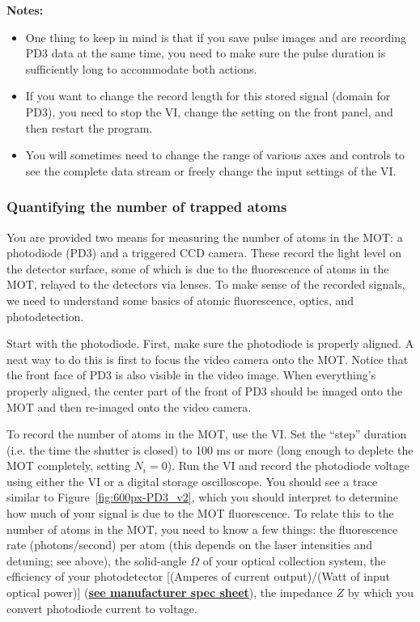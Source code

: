 \documentclass{../lab}
\begin{document}
\textbf{Notes:}

\begin{itemize}
    \item One thing to keep in mind is that if you save pulse images and are recording PD3 data at the same time, you need to make sure the pulse duration is sufficiently long to accommodate both actions.

    \item If you want to change the record length for this stored signal (domain for PD3), you need to stop the VI, change the setting on the front panel, and then restart the program.

    \item You will sometimes need to change the range of various axes and controls to see the complete data stream or freely change the input settings of the VI.
\end{itemize}

\subsubsection{Quantifying the number of trapped atoms}

You are provided two means for measuring the number of atoms in the MOT: a photodiode (PD3) and a triggered CCD camera. These record the light level on the detector surface, some of which is due to the fluorescence of atoms in the MOT, relayed to the detectors via lenses. To make sense of the recorded signals, we need to understand some basics of atomic fluorescence, optics, and photodetection.

Start with the photodiode. First, make sure the photodiode is properly aligned. A neat way to do this is first to focus the video camera onto the MOT. Notice that the front face of PD3 is also visible in the video image. When everything's properly aligned, the center part of the front of PD3 should be imaged onto the MOT and then re-imaged onto the video camera.

To record the number of atoms in the MOT, use the VI. Set the ``step'' duration (i.e. the time the shutter is closed) to 100 ms or more (long enough to deplete the MOT completely, setting $N_i = 0$). Run the VI and record the photodiode voltage using either the VI or a digital storage oscilloscope. You should see a trace similar to Figure~\ref{fig:600px-PD3_v2}, which you should interpret to determine how much of your signal is due to the MOT fluorescence. To relate this to the number of atoms in the MOT, you need to know a few things: the fluorescence rate (photons/second) per atom (this depends on the laser intensities and detuning; see above), the solid-angle $\Omega$ of your optical collection system, the efficiency of your photodetector [(Amperes of current output)/(Watt of input optical power)] (\href{http://experimentationlab.berkeley.edu/sites/default/files/images/Photodiode\_info.pdf}{\textbf{see manufacturer spec sheet}}), the impedance $Z$ by which you convert photodiode current to voltage.
\end{document}
